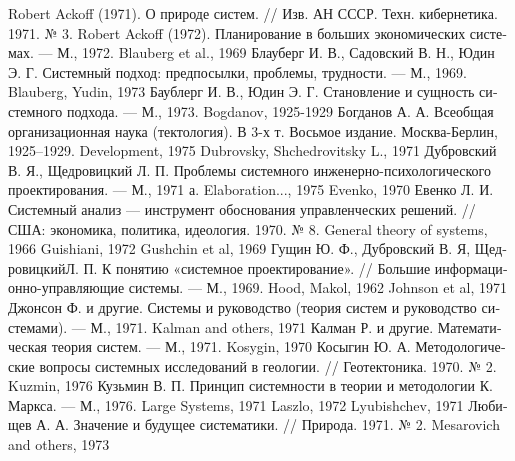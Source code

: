 \documentclass[11pt,a4paper]{article}
\begin{document}
\begin{thebibliography}{xxx}
 Robert Ackoff (1971). \foreignlanguage{russian}{О природе
  систем. // Изв. АН СССР. Техн. кибернетика. 1971. № 3.  }
 Robert Ackoff
  (1972). \foreignlanguage{russian}{Планирование в больших экономических
  системах. — М., 1972.  }
 Blauberg et al., 1969
  \foreignlanguage{russian}{Блауберг И. В., Садовский В. Н., Юдин
    Э. Г. Системный подход: предпосылки, проблемы, трудности. — М., 1969.}
 Blauberg, Yudin, 1973
  \foreignlanguage{russian}{Баублерг И. В., Юдин Э. Г. Становление и сущность
    системного подхода. — М., 1973. }
 Bogdanov, 1925-1929 \foreignlanguage{russian}{Богданов
  А. А. Всеобщая организационная наука (тектология). В 3-х т. Восьмое
  издание. Москва-Берлин, 1925–1929.  }
 Development, 1975
 Dubrovsky, Shchedrovitsky L., 1971
  \foreignlanguage{russian}{Дубровский В. Я., Щедровицкий Л. П. Проблемы
    системного инженерно-психологического проектирования. — М., 1971 а.}
 Elaboration..., 1975
 Evenko, 1970 \foreignlanguage{russian}{Евенко
  Л. И. Системный анализ — инструмент обоснования управленческих решений. //
  США: экономика, политика, идеология. 1970. № 8.  }
 General theory of systems, 1966
 Guishiani, 1972
 Gushchin et al, 1969 \foreignlanguage{russian}{Гущин
  Ю. Ф., Дубровский В. Я, ЩедровицкийЛ. П. К понятию «системное
  проектирование». // Большие информационно-управляющие системы. — М., 1969.}
 Hood, Makol, 1962 
 Johnson et al, 1971 \foreignlanguage{russian}{Джонсон
  Ф. и другие. Системы и руководство (теория систем и руководство
  системами). — М., 1971.}
 Kalman and others, 1971 \foreignlanguage{russian}{Калман
  Р. и другие.  Математическая теория систем. — М., 1971.}
 Kosygin, 1970 \foreignlanguage{russian}{Косыгин
  Ю. А. Методологические вопросы системных исследований в геологии. //
  Геотектоника. 1970. № 2.}
 Kuzmin, 1976 \foreignlanguage{russian}{Кузьмин
  В. П. Принцип системности в теории и методологии К. Маркса. — М., 1976.}
 Large Systems, 1971
 Laszlo, 1972
 Lyubishchev, 1971 \foreignlanguage{russian}{Любищев
  А. А. Значение и будущее систематики. // Природа. 1971. № 2.}
 Mesarovich and others, 1973

\end{thebibliography}
\end{document}
